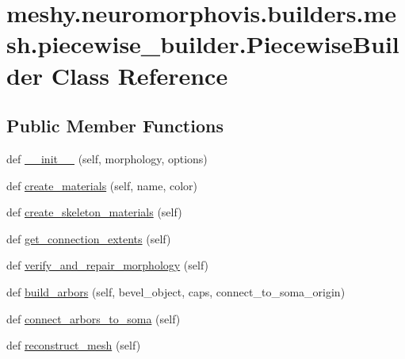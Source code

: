 \hypertarget{classmeshy_1_1neuromorphovis_1_1builders_1_1mesh_1_1piecewise__builder_1_1PiecewiseBuilder}{}\section{meshy.\+neuromorphovis.\+builders.\+mesh.\+piecewise\+\_\+builder.\+Piecewise\+Builder Class Reference}
\label{classmeshy_1_1neuromorphovis_1_1builders_1_1mesh_1_1piecewise__builder_1_1PiecewiseBuilder}


 


\subsection*{Public Member Functions}
\begin{DoxyCompactItemize}
\item 
def \hyperlink{classmeshy_1_1neuromorphovis_1_1builders_1_1mesh_1_1piecewise__builder_1_1PiecewiseBuilder_a79f94ae47bacbc3a7c9e30fa6bd03a56}{\+\_\+\+\_\+init\+\_\+\+\_\+} (self, morphology, options)
\item 
def \hyperlink{classmeshy_1_1neuromorphovis_1_1builders_1_1mesh_1_1piecewise__builder_1_1PiecewiseBuilder_a1ecb4b16fa25418dcde85eb6c09b1bb3}{create\+\_\+materials} (self, name, color)
\item 
def \hyperlink{classmeshy_1_1neuromorphovis_1_1builders_1_1mesh_1_1piecewise__builder_1_1PiecewiseBuilder_a9f5da437d388777b1a277cea8a5ad965}{create\+\_\+skeleton\+\_\+materials} (self)
\item 
def \hyperlink{classmeshy_1_1neuromorphovis_1_1builders_1_1mesh_1_1piecewise__builder_1_1PiecewiseBuilder_a05e78b7026e0f7dc8bd98c3f5bc1c78b}{get\+\_\+connection\+\_\+extents} (self)
\item 
def \hyperlink{classmeshy_1_1neuromorphovis_1_1builders_1_1mesh_1_1piecewise__builder_1_1PiecewiseBuilder_a62f9a4c17ed4b74daaab685f54e8f85e}{verify\+\_\+and\+\_\+repair\+\_\+morphology} (self)
\item 
def \hyperlink{classmeshy_1_1neuromorphovis_1_1builders_1_1mesh_1_1piecewise__builder_1_1PiecewiseBuilder_a2a65afb73af0c040b68293d42f395c26}{build\+\_\+arbors} (self, bevel\+\_\+object, caps, connect\+\_\+to\+\_\+soma\+\_\+origin)
\item 
def \hyperlink{classmeshy_1_1neuromorphovis_1_1builders_1_1mesh_1_1piecewise__builder_1_1PiecewiseBuilder_a388cdc58b20bcc32403a37b9ff5d803b}{connect\+\_\+arbors\+\_\+to\+\_\+soma} (self)
\item 
def \hyperlink{classmeshy_1_1neuromorphovis_1_1builders_1_1mesh_1_1piecewise__builder_1_1PiecewiseBuilder_a351331fa0daa0f7bdbd55cd96fd0e945}{reconstruct\+\_\+mesh} (self)
\end{DoxyCompactItemize}
